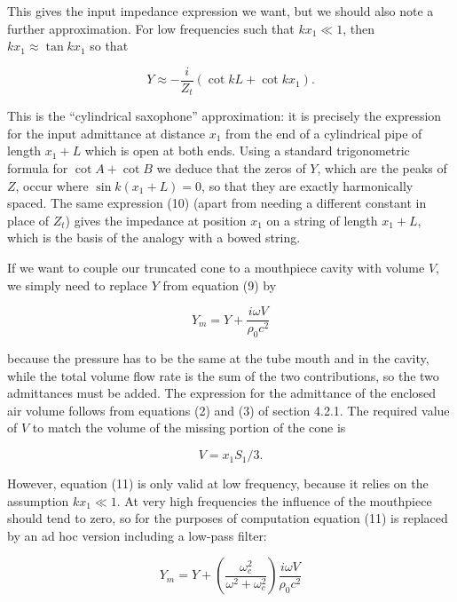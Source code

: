   This gives the input impedance expression we want, but we should also note a 
  further approximation. For low frequencies such that $kx_1 \ll 1$, then $kx_1 
  \approx \tan kx_1$ so that 

  \begin{equation*}Y \approx -\dfrac{i}{Z_t}\left(\cot kL + \cot kx_1 \right) . 
  \tag{10}\end{equation*} 

  This is the ``cylindrical saxophone'' approximation: it is precisely the 
  expression for the input admittance at distance $x_1$ from the end of a 
  cylindrical pipe of length $x_1+L$ which is open at both ends. Using a 
  standard trigonometric formula for $\cot A + \cot B$ we deduce that the zeros 
  of $Y$, which are the peaks of $Z$, occur where $\sin k(x_1+L)=0$, so that 
  they are exactly harmonically spaced. The same expression (10) (apart from 
  needing a different constant in place of $Z_t$) gives the impedance at 
  position $x_1$ on a string of length $x_1+L$, which is the basis of the 
  analogy with a bowed string. 

  If we want to couple our truncated cone to a mouthpiece cavity with volume 
  $V$, we simply need to replace $Y$ from equation (9) by 

  \begin{equation*}Y_m=Y+\dfrac{i \omega V}{\rho_0 c^2} \tag{11}\end{equation*} 

  \noindent{}because the pressure has to be the same at the tube mouth and in 
  the cavity, while the total volume flow rate is the sum of the two 
  contributions, so the two admittances must be added. The expression for the 
  admittance of the enclosed air volume follows from equations (2) and (3) of 
  section 4.2.1. The required value of $V$ to match the volume of the missing 
  portion of the cone is 

  \begin{equation*}V=x_1 S_1/3 . \tag{12}\end{equation*} 

  However, equation (11) is only valid at low frequency, because it relies on 
  the assumption $kx_1 \ll 1$. At very high frequencies the influence of the 
  mouthpiece should tend to zero, so for the purposes of computation equation 
  (11) is replaced by an ad hoc version including a low-pass filter: 

  \begin{equation*}Y_m=Y+\left( \dfrac{\omega_c^2}{\omega^2+\omega_c^2} \right) 
  \dfrac{i \omega V}{\rho_0 c^2} \tag{13}\end{equation*} 


